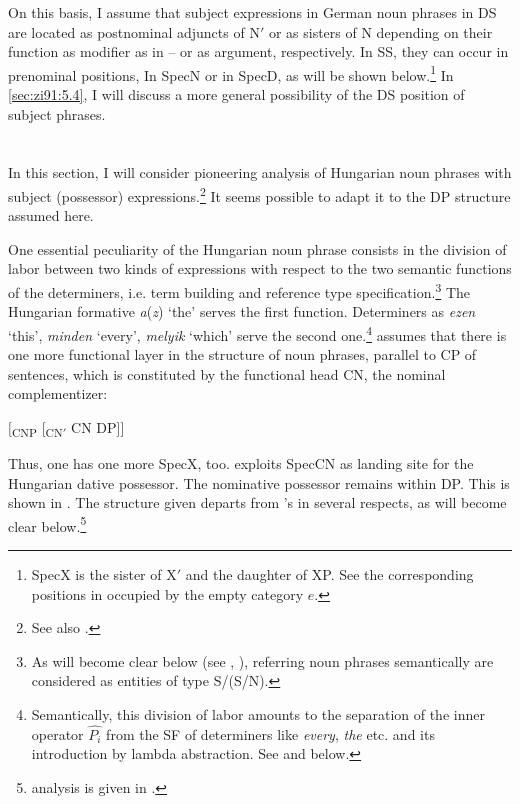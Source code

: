 \documentclass[output=paper,colorlinks,citecolor=brown]{langscibook}
\begin{document}
\largerpage
On this basis, I assume that subject expressions in German noun phrases in DS are located as postnominal adjuncts of N$'$ or as sisters of N depending on their function as modifier as in -- or as argument, respectively. In SS, they can occur in prenominal positions, In SpecN or in SpecD, as will be shown below.\footnote{SpecX is the sister of X$'$ and the daughter of XP. See the corresponding positions in  occupied by the empty category $e$.} In \ref{sec:zi91:5.4}, I will discuss a more general possibility of the DS position of subject phrases.

\section{} \label{sec:zi91:3}

In this section, I will consider  pioneering analysis of Hungarian noun phrases with subject (possessor) expressions.\footnote{See also \citet{Szabolosi81The-possessive-Hungarian, Szabolosi83Possessor-ran-away}.} It seems possible to adapt it to the DP structure assumed here.

One essential peculiarity of the Hungarian noun phrase consists in the division of labor between two kinds of expressions with respect to the two semantic functions of the determiners, i.e. term building and reference type specification.\footnote{As will become clear below (see , ), referring noun phrases semantically are considered as entities of type S/(S/N).} The Hungarian formative \textit{a}(\textit{z}) ‘the’ serves the first function. Determiners as \textit{ezen} `this', \textit{minden} `every', \textit{melyik} `which' serve the second one.\footnote{Semantically, this division of labor amounts to the separation of the inner operator $\widehat{P_{i}}$ from the SF of determiners like \textit{every}, \textit{the} etc. and its introduction by lambda abstraction. See  and  below.} \citet{Szabolosi87Functional-categories} assumes that there is one more functional layer in the structure of noun phrases, parallel to CP of sentences, which is constituted by the functional head CN, the nominal complementizer:

\ea \label{ex:zi91:16} $[$\textsubscript{CNP} [\textsubscript{CN$'$} CN DP]]
\z

\noindent Thus, one has one more SpecX, too. \citeauthor{Szabolosi87Functional-categories} exploits SpecCN as landing site for the Hungarian dative possessor. The nominative possessor remains within DP. This is shown in . The structure given departs from \citeauthor{Szabolosi87Functional-categories}'s in several respects, as will become clear below.\footnote{ analysis is given in .}
\end{document}
